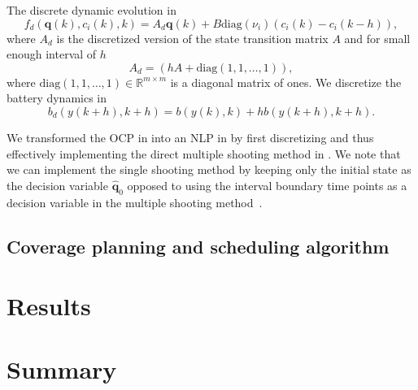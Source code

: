 The discrete dynamic evolution in 
\begin{equation}
  f_d(\mathbf{q}(k),c_i(k),k)=A_d\mathbf{q}(k)+B\mathrm{diag}(\nu_i)(c_i(k)-c_i(k-h)),
\end{equation}
where $A_d$ is the discretized version of the state transition matrix $A$ and for small enough interval of $h$
\begin{equation}
A_d=(hA+\mathrm{diag}(1,1,\dots,1)),
\end{equation}
where $\mathrm{diag}(1,1,\dots,1)\in\mathbb{R}^{m\times m}$ is a diagonal matrix of ones. We discretize the battery dynamics in  
\begin{equation}
  b_d(y(k+h),k+h)=b(y(k),k)+hb(y(k+h),k+h).
\end{equation}

We transformed the OCP in  into an NLP in  by first discretizing and thus effectively implementing the direct multiple shooting method in . We note that we can implement the single shooting method by keeping only the initial state as the decision variable $\hat{\mathbf{q}}_0$ opposed to 
using the interval boundary time points as a decision variable in the multiple shooting method~\citep{rawlings2017model}.



\subsection{Coverage planning and scheduling algorithm}
\label{sec:algo}


\section{\color{red}Results}


\section{\color{red}Summary}

